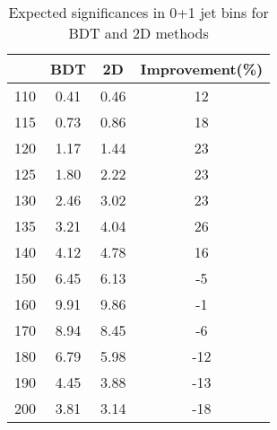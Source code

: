 \begin{table}[!htb] 
	\centering
	\begin{tabular}{c | c c | c }
   	\hline \hline
	\mHi & BDT & 2D & Improvement(\%) \\
	\hline
	110 & 0.41 & 0.46 & 12 \\
	115 & 0.73 & 0.86 & 18 \\
	120 & 1.17 & 1.44 & 23 \\
	125 & 1.80 & 2.22 & 23 \\
	130 & 2.46 & 3.02 & 23 \\
	135 & 3.21 & 4.04 & 26 \\
	140 & 4.12 & 4.78 & 16 \\
	150 & 6.45 & 6.13 & -5 \\
	160 & 9.91 & 9.86 & -1 \\
	170 & 8.94 & 8.45 & -6 \\
	180 & 6.79 & 5.98 & -12 \\
	190 & 4.45 & 3.88 & -13 \\
	200 & 3.81 & 3.14 & -18 \\
   	\hline \hline
	\end{tabular}
	\caption{Expected significances in 0+1 jet bins for BDT and 2D methods}
\end{table} 

